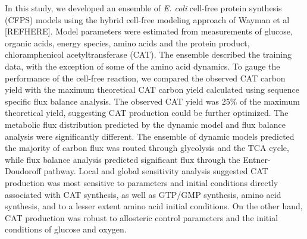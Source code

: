 \documentclass[12pt]{article}
\begin{document}
In this study, we developed an ensemble of \textit{E. coli} cell-free protein synthesis (CFPS) models using the hybrid cell-free modeling approach of Wayman et al [REFHERE].
Model parameters were estimated from measurements of glucose, organic acids, energy species, amino acids and the protein product, chloramphenicol acetyltransferase (CAT).
The ensemble described the training data, with the exception of some of the amino acid dynamics.
To gauge the performance of the cell-free reaction, we compared the observed CAT carbon yield with the maximum theoretical CAT carbon yield calculated using sequence specific flux balance analysis.
The observed CAT yield was 25\% of the maximum theoretical yield, suggesting CAT production could be further optimized.
The metabolic flux distribution predicted by the dynamic model and flux balance analysis were significantly different.
The ensemble of dynamic models predicted the majority of carbon flux was routed through glycolysis and the TCA cycle, while flux balance analysis predicted significant flux through the Entner-Doudoroff pathway.
Local and global sensitivity analysis suggested CAT production was most sensitive to parameters and initial conditions directly associated with CAT synthesis, as well as GTP/GMP synthesis, amino acid synthesis, and to a lesser extent amino acid initial conditions.
On the other hand, CAT production was robust to allosteric control parameters and the initial conditions of glucose and oxygen.
\end{document}
